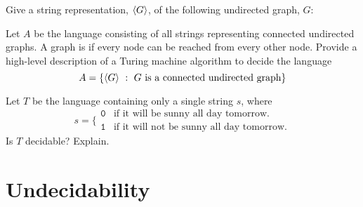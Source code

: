 \documentclass[twoside,letterpaper,openany]{book}
\begin{document}
\begin{exer}
Give a string representation, ${\langle{G}\rangle}$, of the following undirected graph, $G$:

\begin{center}
\end{center}
\end{exer}

\begin{exer}  %
Let $A$ be the language consisting of all strings representing connected undirected graphs. A graph is  if every node can be reached from every other node. Provide a high-level description of a Turing machine algorithm to decide the language
\[ A = \left\lbrace {\langle{G}\rangle}\ :\ G~\textrm{is a connected undirected graph} \right\rbrace \]
\end{exer}

\begin{exer}
Let $T$ be the language containing only a single string $s$, where
\[ s = \bigg\{
\begin{array}{ll}
\texttt{0} &  \textrm{if it will be sunny all day tomorrow.} \\
\texttt{1} & \textrm{if it will not be sunny all day tomorrow.}
\end{array}
\]
Is $T$ decidable? Explain. 
\end{exer}

\clearpage

\section{Undecidability}
\end{document}
